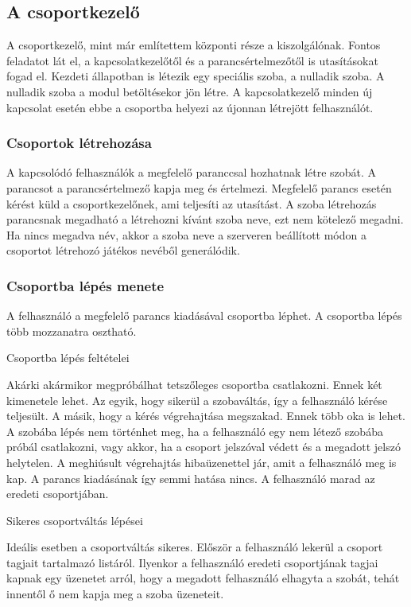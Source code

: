\documentclass[bibliography=totocnumbered]{article}
\begin{document}
\subsection{A csoportkezelő}

A csoportkezelő, mint már említettem központi része a kiszolgálónak.
Fontos feladatot lát el, a kapcsolatkezelőtől és a parancsértelmezőtől
is utasításokat fogad el. Kezdeti állapotban is létezik egy speciális
szoba, a nulladik szoba. A nulladik szoba a modul betöltésekor jön
létre. A kapcsolatkezelő minden új kapcsolat esetén ebbe a csoportba
helyezi az újonnan létrejött felhasználót.


\subsubsection{Csoportok
létrehozása}

A kapcsolódó felhasználók a megfelelő paranccsal hozhatnak létre szobát.
A parancsot a parancsértelmező kapja meg és értelmezi. Megfelelő parancs
esetén kérést küld a csoportkezelőnek, ami teljesíti az utasítást. A
szoba létrehozás parancsnak megadható a létrehozni kívánt szoba neve,
ezt nem kötelező megadni. Ha nincs megadva név, akkor a szoba neve a
szerveren beállított módon a csoportot létrehozó játékos nevéből
generálódik.


\subsubsection{Csoportba lépés
menete}

A felhasználó a megfelelő parancs kiadásával csoportba léphet. A
csoportba lépés több mozzanatra osztható.

Csoportba lépés feltételei

Akárki akármikor megpróbálhat tetszőleges csoportba csatlakozni. Ennek
két kimenetele lehet. Az egyik, hogy sikerül a szobaváltás, így a
felhasználó kérése teljesült. A másik, hogy a kérés végrehajtása
megszakad. Ennek több oka is lehet. A szobába lépés nem történhet meg,
ha a felhasználó egy nem létező szobába próbál csatlakozni, vagy akkor,
ha a csoport jelszóval védett és a megadott jelszó helytelen. A
meghiúsult végrehajtás hibaüzenettel jár, amit a felhasználó meg is kap.
A parancs kiadásának így semmi hatása nincs. A felhasználó marad az
eredeti csoportjában.

Sikeres csoportváltás lépései

Ideális esetben a csoportváltás sikeres. Először a felhasználó lekerül a
csoport tagjait tartalmazó listáról. Ilyenkor a felhasználó eredeti
csoportjának tagjai kapnak egy üzenetet arról, hogy a megadott
felhasználó elhagyta a szobát, tehát innentől ő nem kapja meg a szoba
üzeneteit.
\end{document}

